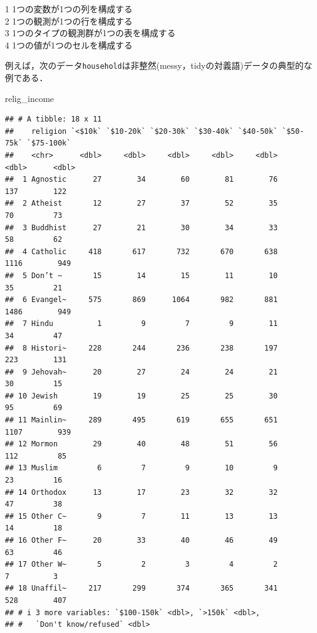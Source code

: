 \documentclass[
]{article}
\newenvironment{Shaded}{\begin{snugshade}}{\end{snugshade}}
\newcommand{\NormalTok}[1]{#1}
\begin{document}
1 1つの変数が1つの列を構成する\\
2 1つの観測が1つの行を構成する\\
3 1つのタイプの観測群が1つの表を構成する\\
4 1つの値が1つのセルを構成する

例えば，次のデータ\texttt{household}は非整然(messy，tidyの対義語)データの典型的な例である．

\begin{Shaded}
\begin{Highlighting}[]
\NormalTok{relig\_income}
\end{Highlighting}
\end{Shaded}

\begin{verbatim}
## # A tibble: 18 x 11
##    religion `<$10k` `$10-20k` `$20-30k` `$30-40k` `$40-50k` `$50-75k` `$75-100k`
##    <chr>      <dbl>     <dbl>     <dbl>     <dbl>     <dbl>     <dbl>      <dbl>
##  1 Agnostic      27        34        60        81        76       137        122
##  2 Atheist       12        27        37        52        35        70         73
##  3 Buddhist      27        21        30        34        33        58         62
##  4 Catholic     418       617       732       670       638      1116        949
##  5 Don’t ~       15        14        15        11        10        35         21
##  6 Evangel~     575       869      1064       982       881      1486        949
##  7 Hindu          1         9         7         9        11        34         47
##  8 Histori~     228       244       236       238       197       223        131
##  9 Jehovah~      20        27        24        24        21        30         15
## 10 Jewish        19        19        25        25        30        95         69
## 11 Mainlin~     289       495       619       655       651      1107        939
## 12 Mormon        29        40        48        51        56       112         85
## 13 Muslim         6         7         9        10         9        23         16
## 14 Orthodox      13        17        23        32        32        47         38
## 15 Other C~       9         7        11        13        13        14         18
## 16 Other F~      20        33        40        46        49        63         46
## 17 Other W~       5         2         3         4         2         7          3
## 18 Unaffil~     217       299       374       365       341       528        407
## # i 3 more variables: `$100-150k` <dbl>, `>150k` <dbl>,
## #   `Don't know/refused` <dbl>
\end{verbatim}
\end{document}

